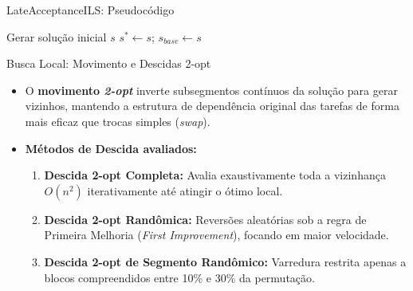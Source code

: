 \documentclass{beamer}
\begin{document}
\begin{frame}[fragile]{LateAcceptanceILS: Pseudocódigo}
    \begin{center}
    \scriptsize
        \begin{algorithm}[H]
        Gerar solução inicial $s$\;
        $s^* \leftarrow s$; $s_{base} \leftarrow s$\;
        \end{algorithm}
    \end{center}
\end{frame}

\begin{frame}{Busca Local: Movimento e Descidas 2-opt}
    \begin{itemize}
        \item O \textbf{movimento \textit{2-opt}} inverte subsegmentos contínuos da solução para gerar vizinhos, mantendo a estrutura de dependência original das tarefas de forma mais eficaz que trocas simples (\textit{swap}).
        \vspace{0.3cm}
        \item \textbf{Métodos de Descida avaliados:}
        \begin{enumerate}
            \item \textbf{Descida 2-opt Completa:} Avalia exaustivamente toda a vizinhança $O(n^2)$ iterativamente até atingir o ótimo local.
            \item \textbf{Descida 2-opt Randômica:} Reversões aleatórias sob a regra de Primeira Melhoria (\textit{First Improvement}), focando em maior velocidade.
            \item \textbf{Descida 2-opt de Segmento Randômico:} Varredura restrita apenas a blocos compreendidos entre 10\% e 30\% da permutação.
        \end{enumerate}
    \end{itemize}
\end{frame}
\end{document}
